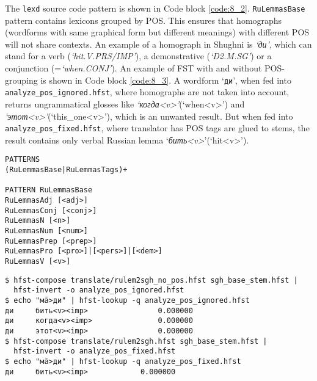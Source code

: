 The \texttt{lexd} source code pattern is shown in Code block \ref{code:8_2}. \texttt{RuLemmasBase} pattern contains lexicons grouped by POS. This ensures that homographs (wordforms with same graphical form but different meanings) with different POS will not share contexts. An example of a homograph in Shughni is \textit{`ди'}, which can stand for a verb (\textit{`hit.V.PRS/IMP'}), a demonstrative (\textit{`D2.M.SG'}) or a conjunction (=\textit{`when.CONJ'}). An example of FST with and without POS-grouping is shown in Code block \ref{code:8_3}. A wordform `\texttt{ди}', when fed into \texttt{analyze\_pos\_ignored.hfst}, where homographs are not taken into account, returns ungrammatical glosses like \textit{`когда<v>'}(`when<v>') and \textit{`этот<v>'}(`this\_one<v>'), which is an unwanted result. But when fed into \texttt{analyze\_pos\_fixed.hfst}, where translator has POS tags are glued to stems, the result contains only verbal Russian lemma `\textit{бить<v>}'(`hit<v>').
\begin{code_frame}[float,floatplacement=h]
    \begin{footnotesize}
    \begin{verbatim}
PATTERNS
(RuLemmasBase|RuLemmasTags)+

PATTERN RuLemmasBase
RuLemmasAdj [<adj>]
RuLemmasConj [<conj>]
RuLemmasN [<n>]
RuLemmasNum [<num>]
RuLemmasPrep [<prep>]
RuLemmasPro [<pro>]|[<pers>]|[<dem>]
RuLemmasV [<v>]
    \end{verbatim}
    \end{footnotesize}
    \tcblower
    \label{code:8_2}
\end{code_frame}

\begin{code_frame}[float,floatplacement=!htbp]
    \begin{footnotesize}
    \begin{verbatim}
$ hfst-compose translate/rulem2sgh_no_pos.hfst sgh_base_stem.hfst | 
  hfst-invert -o analyze_pos_ignored.hfst
$ echo "мā>ди" | hfst-lookup -q analyze_pos_ignored.hfst
ди     бить<v><imp>                0.000000
ди     когда<v><imp>               0.000000
ди     этот<v><imp>                0.000000
$ hfst-compose translate/rulem2sgh.hfst sgh_base_stem.hfst | 
  hfst-invert -o analyze_pos_fixed.hfst
$ echo "мā>ди" | hfst-lookup -q analyze_pos_fixed.hfst
ди     бить<v><imp>            0.000000
    \end{verbatim}
    \end{footnotesize}
    \tcblower
    \label{code:8_3}
\end{code_frame}


